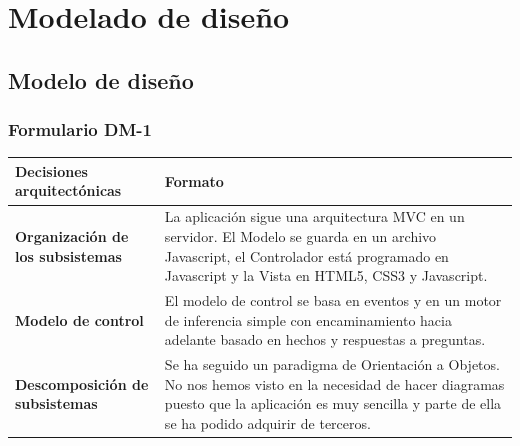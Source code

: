 \documentclass[a4paper,11pt]{article}
\begin{document}
	\section{Modelado de diseño}
		\subsection{Modelo de diseño}
			\subsubsection{Formulario DM-1}
			\begin{center}
				\begin{tabular}{| l | p{5cm} |}
					\hline
					\textbf{Decisiones arquitectónicas} & \textbf{Formato} \\
					\hline
					\textbf{Organización de los subsistemas} & La aplicación sigue una arquitectura MVC en un servidor. El Modelo se guarda en un archivo Javascript, el Controlador está programado en Javascript y la Vista en HTML5, CSS3 y Javascript.
					\\
					\hline
					\textbf{Modelo de control} & El modelo de control se basa en eventos y en
					un motor de inferencia simple con encaminamiento hacia adelante basado en hechos y respuestas a preguntas.\\
					\hline
					\textbf{Descomposición de subsistemas} & Se ha seguido un paradigma de
					Orientación a Objetos. No nos hemos visto en la necesidad de hacer diagramas puesto que la aplicación es muy sencilla y parte de ella se ha podido adquirir de terceros.\\
					\hline
				\end{tabular}
			\end{center}
			\newpage
\end{document}
